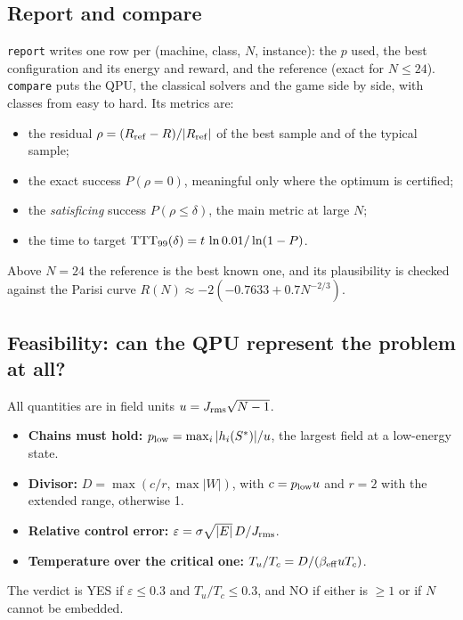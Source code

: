 \documentclass[11pt,a4paper]{article}
\newcommand{\code}[1]{\nolinkurl{#1}}
\newcommand{\src}[4]{}
\begin{document}
\subsection{Report and compare}
\code{report} writes one row per (machine, class, $N$, instance): the $p$ used, the best configuration and its energy
and reward, and the reference (exact for $N\le24$). \code{compare} puts the QPU, the classical solvers and the game
side by side, with classes from easy to hard. Its metrics are:
\begin{itemize}
\item the residual $\rho=(R_{\rm ref}-R)/|R_{\rm ref}|$ of the best sample and of the typical sample;
\item the exact success $P(\rho=0)$, meaningful only where the optimum is certified;
\item the \emph{satisficing} success $P(\rho\le\delta)$, the main metric at large $N$;
\item the time to target ${\rm TTT}_{99}(\delta)=t\,\ln0.01/\ln(1-P)$.
\end{itemize}
Above $N=24$ the reference is the best known one, and its plausibility is checked against the Parisi curve
$R(N)\approx-2(-0.7633+0.7N^{-2/3})$.

\subsection{Feasibility: can the QPU represent the problem at all?}
All quantities are in field units $u=J_{\rm rms}\sqrt{N-1}$.
\begin{itemize}
\item \textbf{Chains must hold:} $p_{\rm low}=\max_i|h_i(S^*)|/u$, the largest field at a low-energy state.
\item \textbf{Divisor:} $D=\max(c/r,\max|W|)$, with $c=p_{\rm low}u$ and $r=2$ with the extended range, otherwise 1.
\item \textbf{Relative control error:} $\varepsilon=\sigma\sqrt{|E|}\,D/J_{\rm rms}$.
\item \textbf{Temperature over the critical one:} $T_u/T_c=D/(\beta_{\rm eff}uT_c)$.
\end{itemize}
The verdict is YES if $\varepsilon\le0.3$ and $T_u/T_c\le0.3$, and NO if either is $\ge1$ or if $N$ cannot be embedded.
\src{dwave_utils/feasibility.py}{\rAssessA}{\rAssessB}{the verdict}
\end{document}
